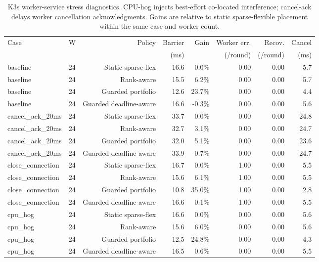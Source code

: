 \begin{table}[t]
  \centering
  \scriptsize
  \setlength{\tabcolsep}{3pt}
  \caption{K3s worker-service stress diagnostics. CPU-hog injects best-effort co-located interference; cancel-ack delays worker cancellation acknowledgments. Gains are relative to static sparse-flexible placement within the same case and worker count.}
  \label{tab:k8s-stress}
  \begin{tabular}{@{}llrrrrrr@{}}
    \toprule
    Case & W & Policy & Barrier & Gain & Worker err. & Recov. & Cancel \\
         &   &        & (ms) &      & (/round) & (/round) & (ms) \\
    \midrule
    baseline & 24 & Static sparse-flex & 16.6 & 0.0\% & 0.00 & 0.00 & 5.7 \\
    baseline & 24 & Rank-aware & 15.5 & 6.2\% & 0.00 & 0.00 & 5.7 \\
    baseline & 24 & Guarded portfolio & 12.6 & 23.7\% & 0.00 & 0.00 & 4.4 \\
    baseline & 24 & Guarded deadline-aware & 16.6 & -0.3\% & 0.00 & 0.00 & 5.6 \\
    cancel\_ack\_20ms & 24 & Static sparse-flex & 33.7 & 0.0\% & 0.00 & 0.00 & 24.8 \\
    cancel\_ack\_20ms & 24 & Rank-aware & 32.7 & 3.1\% & 0.00 & 0.00 & 24.7 \\
    cancel\_ack\_20ms & 24 & Guarded portfolio & 32.0 & 5.1\% & 0.00 & 0.00 & 23.6 \\
    cancel\_ack\_20ms & 24 & Guarded deadline-aware & 33.9 & -0.7\% & 0.00 & 0.00 & 24.7 \\
    close\_connection & 24 & Static sparse-flex & 16.7 & 0.0\% & 1.00 & 0.00 & 5.5 \\
    close\_connection & 24 & Rank-aware & 15.6 & 6.1\% & 1.00 & 0.00 & 5.5 \\
    close\_connection & 24 & Guarded portfolio & 10.8 & 35.0\% & 1.00 & 0.00 & 2.8 \\
    close\_connection & 24 & Guarded deadline-aware & 16.6 & 0.1\% & 1.00 & 0.00 & 5.5 \\
    cpu\_hog & 24 & Static sparse-flex & 16.6 & 0.0\% & 0.00 & 0.00 & 5.6 \\
    cpu\_hog & 24 & Rank-aware & 15.6 & 6.0\% & 0.00 & 0.00 & 5.6 \\
    cpu\_hog & 24 & Guarded portfolio & 12.5 & 24.8\% & 0.00 & 0.00 & 4.3 \\
    cpu\_hog & 24 & Guarded deadline-aware & 16.5 & 0.6\% & 0.00 & 0.00 & 5.5 \\
    \bottomrule
  \end{tabular}
\end{table}

